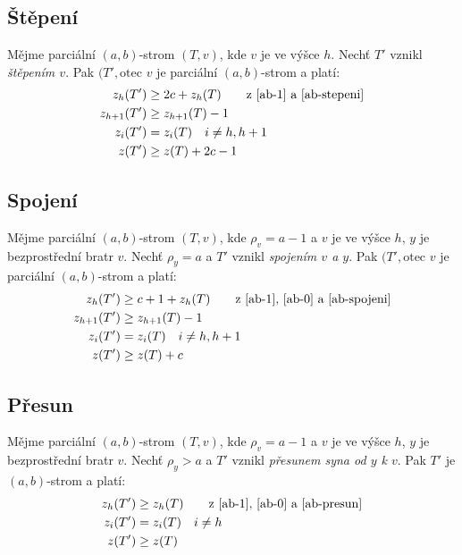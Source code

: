 \subsection{Štěpení}

Mějme parciální $(a,b)$-strom $(T,v)$, kde $v$ je ve výšce $h$.
Nechť $T'$ vznikl \emph{štěpením $v$}. 
Pak $(T',\text{otec }v$ je parciální $(a,b)$-strom a platí:
\begin{align}
  z_h(T')       & \geq 2c + z_h(T)
	\qquad\text{z \ref{ab-1} a \ref{ab-stepeni}}\\
  z_{h+1}(T')   & \geq z_{h+1}(T) - 1\\
  z_i(T')       & = z_i(T) \quad i \neq h, h+1\\
  z(T')         & \geq z(T) + 2c - 1
\end{align}

\subsection{Spojení}

Mějme parciální $(a,b)$-strom $(T,v)$, kde $\rho_v = a-1$ a 
$v$ je ve výšce $h$, $y$ je bezprostřední bratr $v$.
Nechť $\rho_y = a$ a $T'$ vznikl \emph{spojením $v$ a $y$}. 
Pak $(T',\text{otec }v$ je parciální $(a,b)$-strom a platí:
\begin{align}
  z_h(T')       & \geq c + 1 + z_h(T)
	\qquad\text{z \ref{ab-1}, \ref{ab-0} a \ref{ab-spojeni}}\\
  z_{h+1}(T')   & \geq z_{h+1}(T) - 1\\
  z_i(T')       & = z_i(T) \quad i \neq h, h+1\\
  z(T')         & \geq z(T) + c
\end{align}

\subsection{Přesun}

Mějme parciální $(a,b)$-strom $(T,v)$, kde $\rho_v = a-1$ a 
$v$ je ve výšce $h$, $y$ je bezprostřední bratr $v$.
Nechť $\rho_y > a$ a $T'$ vznikl \emph{přesunem syna od $y$ k $v$}. 
Pak $T'$ je $(a,b)$-strom a platí:
\begin{align}
  z_h(T')       & \geq z_h(T)
	\qquad\text{z \ref{ab-1}, \ref{ab-0} a \ref{ab-presun}}\\
  z_i(T')       & = z_i(T) \quad i \neq h\\
  z(T')         & \geq z(T)
\end{align}

